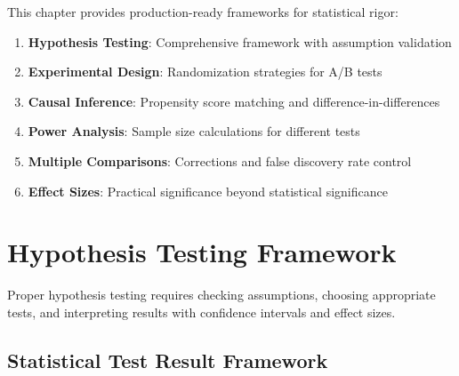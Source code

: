 This chapter provides production-ready frameworks for statistical rigor:

\begin{enumerate}
    \item \textbf{Hypothesis Testing}: Comprehensive framework with assumption validation
    \item \textbf{Experimental Design}: Randomization strategies for A/B tests
    \item \textbf{Causal Inference}: Propensity score matching and difference-in-differences
    \item \textbf{Power Analysis}: Sample size calculations for different tests
    \item \textbf{Multiple Comparisons}: Corrections and false discovery rate control
    \item \textbf{Effect Sizes}: Practical significance beyond statistical significance
\end{enumerate}

\section{Hypothesis Testing Framework}

Proper hypothesis testing requires checking assumptions, choosing appropriate tests, and interpreting results with confidence intervals and effect sizes.

\subsection{Statistical Test Result Framework}

